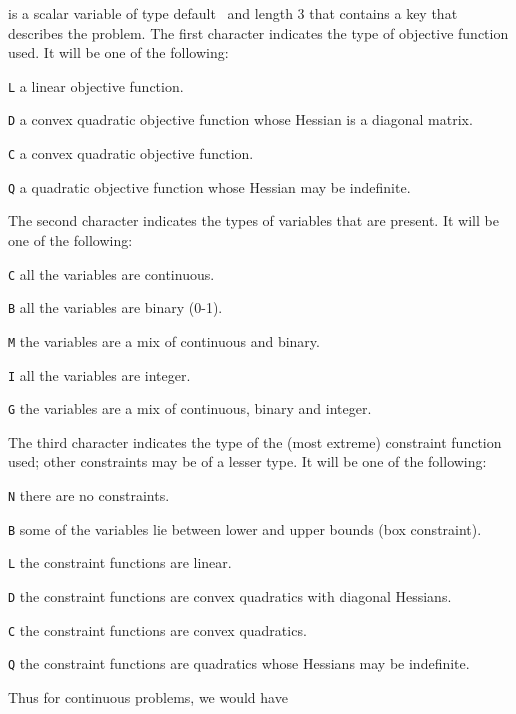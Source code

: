 \documentclass{galahad}
\begin{document}
\begin{description}
 is a scalar variable of type default \character\
and length 3 that contains a key that describes the problem.
The first character indicates the type of objective function used.
It will be one of the following:
\begin{description}
   \item {\tt L} a linear objective function.
   \item {\tt D} a convex quadratic objective function whose Hessian is a
           diagonal matrix.
   \item {\tt C} a convex quadratic objective function.
   \item {\tt Q} a quadratic objective function whose Hessian may be indefinite.
\end{description}
The second character indicates the types of variables that are present.
     It will be one of the following:
\begin{description}
    \item {\tt C}  all the variables are continuous.
    \item {\tt B}  all the variables are binary (0-1).
    \item {\tt M}  the variables are a mix of continuous and binary.
    \item {\tt I}  all the variables are integer.
    \item {\tt G}  the variables are a mix of continuous, binary and integer.
\end{description}
The third character indicates the type of the (most extreme)
     constraint function used; other constraints may be of a lesser type.
     It will be one of the following:
\begin{description}
  \item {\tt N}  there are no constraints.
  \item {\tt B}  some of the variables lie between lower and upper bounds
         (box constraint).
  \item {\tt L}  the constraint functions are linear.
  \item {\tt D}  the constraint functions are convex quadratics with diagonal
         Hessians.
  \item {\tt C}  the constraint functions are convex quadratics.
  \item {\tt Q}  the constraint functions are quadratics whose Hessians
         may be indefinite.
\end{description}
     Thus for continuous problems, we would have
\begin{description}

\end{description}
\end{description}
\end{document}
